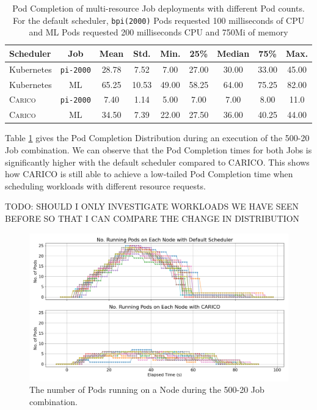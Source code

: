 \begin{table}[H]
\centering
    \begin{tabular}{|l|c|c|c|c|c|c|c|c|}
    \hline
        \bfseries Scheduler & \bfseries Job & \bfseries Mean & \bfseries Std. &
        \bfseries Min. & \bfseries 25\% & \bfseries Median & \bfseries 75\% & \bfseries Max. \\
    \hline
        Kubernetes & \texttt{pi-2000} & 28.78 & 7.52 & 7.00 & 27.00 & 30.00 & 33.00 & 45.00 \\
        Kubernetes & ML & 65.25 & 10.53 & 49.00 & 58.25 & 64.00 & 75.25 & 82.00 \\
        \textsc{Carico} & \texttt{pi-2000} & 7.40 & 1.14 & 5.00 & 7.00 & 7.00 & 8.00 & 11.0 \\
        \textsc{Carico} & ML & 34.50 & 7.39 & 22.00 & 27.50 & 36.00 & 40.25 & 44.00 \\
    \hline
    \end{tabular}
    \caption{Pod Completion of multi-resource Job deployments with different Pod
    counts. For the default scheduler, \texttt{bpi(2000)} Pods requested 100
    milliseconds of CPU and ML Pods requested 200 milliseconds CPU and 750Mi of
    memory}
    \label{tab:mixed-pod-completions}
\end{table}

Table \ref{tab:mixed-pod-completions} gives the Pod Completion Distribution
during an execution of the 500-20 Job combination. We can observe that the
Pod Completion times for both Jobs is significantly higher with the default
scheduler compared to CARICO. This shows how CARICO is still able to achieve a
low-tailed Pod Completion time when scheduling workloads with different resource
requests.

TODO: SHOULD I ONLY INVESTIGATE WORKLOADS WE HAVE SEEN BEFORE SO THAT I CAN
COMPARE THE CHANGE IN DISTRIBUTION

\begin{figure}[H]
    \centering
    \includegraphics[width=\textwidth]{images/mixed-running-pods.png}
    \caption{The number of Pods running on a Node during the
    500-20 Job combination.}
    \label{fig:mixed-pod-running}
\end{figure}

